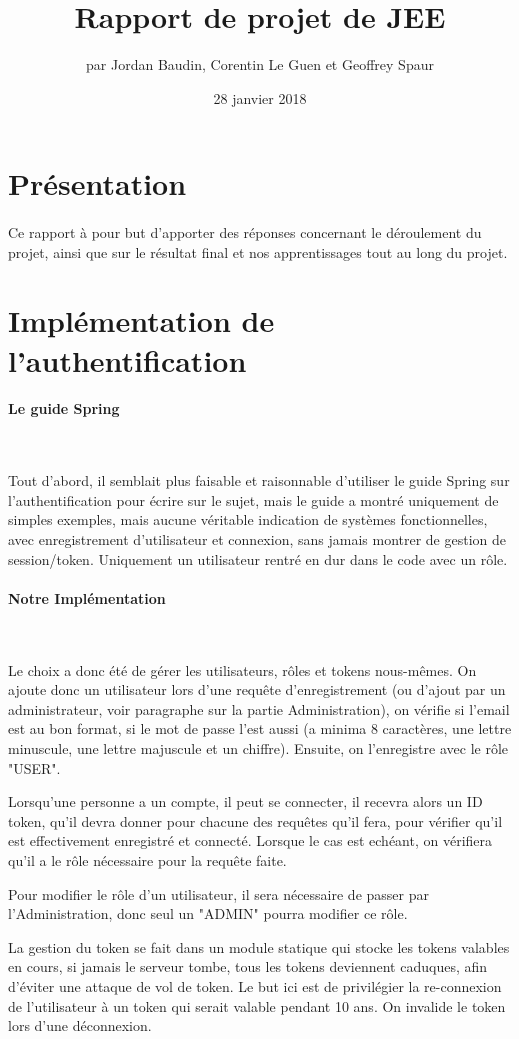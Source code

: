 \documentclass{article}
\title{Rapport de projet de JEE}
\author{par Jordan Baudin, Corentin Le Guen et Geoffrey Spaur}
\date{28 janvier 2018}
\begin{document}
\maketitle
\newpage
\tableofcontents{}
\newpage
\section{Présentation}
  \paragraph{}
  Ce rapport à pour but d'apporter des réponses concernant le déroulement du projet, 
  ainsi que sur le résultat final et nos apprentissages tout au long du projet.
  
  
\section{Implémentation de l'authentification}
  \paragraph{Le guide Spring} \
  
  Tout d'abord, il semblait plus faisable et raisonnable d'utiliser le guide Spring sur l'authentification
  pour écrire sur le sujet, mais le guide a montré uniquement de simples exemples, mais aucune véritable indication
  de systèmes fonctionnelles, avec enregistrement d'utilisateur et connexion, sans jamais montrer de gestion de session/token.
  Uniquement un utilisateur rentré en dur dans le code avec un rôle.

  \paragraph{Notre Implémentation} \
  
  Le choix a donc été de gérer les utilisateurs, rôles et tokens nous-mêmes.
  On ajoute donc un utilisateur lors d'une requête d'enregistrement (ou d'ajout par un administrateur, voir paragraphe sur la partie Administration),
  on vérifie si l'email est au bon format, si le mot de passe l'est aussi (a minima 8 caractères, une lettre minuscule, une lettre majuscule et un chiffre).
  Ensuite, on l'enregistre avec le rôle "USER".

  Lorsqu'une personne a un compte, il peut se connecter, il recevra alors un ID token, qu'il devra donner pour chacune des requêtes qu'il fera,
  pour vérifier qu'il est effectivement enregistré et connecté. Lorsque le cas est echéant, on vérifiera qu'il a le rôle nécessaire pour la requête faite.

  Pour modifier le rôle d'un utilisateur, il sera nécessaire de passer par l'Administration, donc seul un "ADMIN" pourra modifier ce rôle.

  La gestion du token se fait dans un module statique qui stocke les tokens valables en cours, si jamais le serveur tombe, tous les tokens deviennent caduques,
  afin d'éviter une attaque de vol de token. Le but ici est de privilégier la re-connexion de l'utilisateur à un token qui serait valable pendant 10 ans.
  On invalide le token lors d'une déconnexion.
  
\end{document}

